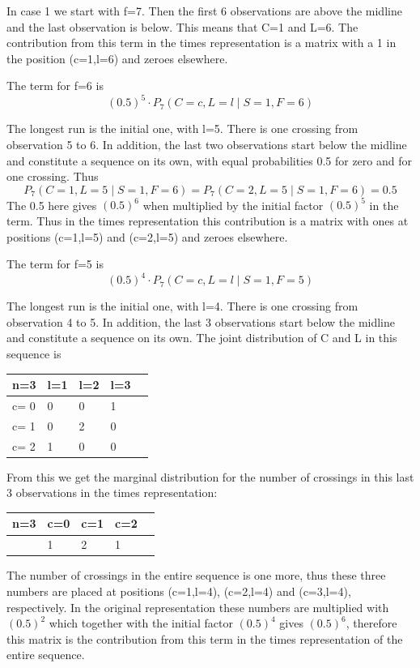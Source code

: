 In case 1 we start with f=7. Then the first 6 observations are above the midline and the last observation is below. This means that C=1 and L=6. The contribution from this term in the times representation is a matrix with a 1 in the position (c=1,l=6) and zeroes elsewhere. 

The term for f=6 is $$(0.5)^5 \cdot   P_7 (C=c, L=l \mid S=1,F=6)$$

The longest run is the initial one, with l=5. There is one crossing from observation 5 to 6. In addition, the last two observations start below the midline and constitute a sequence on its own, with equal probabilities 0.5 for zero and for one crossing. Thus $$P_7 (C=1, L=5 \mid S=1,F=6)=P_7 (C=2, L=5 \mid S=1,F=6)=0.5$$
The 0.5 here gives $(0.5)^6$ when multiplied by the initial factor $(0.5)^5$ in the term. Thus in the times representation this contribution is a matrix with ones at positions (c=1,l=5) and (c=2,l=5) and zeroes elsewhere. 

The term for f=5 is $$(0.5)^4 \cdot   P_7 (C=c, L=l \mid S=1,F=5)$$

The longest run is the initial one, with l=4. There is one crossing from observation 4 to 5. In addition, the last 3 observations start below the midline and constitute a sequence on its own. The joint distribution of C and L in this sequence is 

\begin{tabular}{l | l l l l}
\hline
n=3&l=1&l=2&l=3\\
\hline
c= 0& 0& 0& 1\\
c= 1& 0& 2& 0\\
c= 2& 1& 0& 0\\
\hline
\end{tabular}

From this we get the marginal distribution for the number of crossings in this last 3 observations in the times representation:

\begin{tabular}{l | l l l l}
\hline
n=3&c=0&c=1&c=2\\
\hline
& 1& 2& 1\\
\hline
\end{tabular}


The number of crossings in the entire sequence is one more, thus these three numbers are placed at positions (c=1,l=4), (c=2,l=4) and (c=3,l=4), respectively. In the original representation these numbers are multiplied with $(0.5)^2$ which together with the initial factor $(0.5)^4$ gives $(0.5)^6$, therefore this matrix is the contribution from this term in the times representation of the entire sequence.

